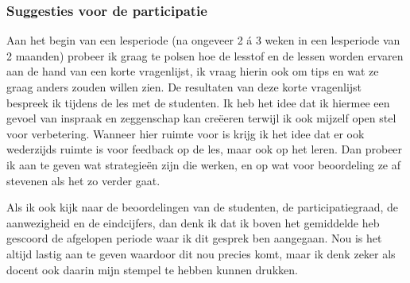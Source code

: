 \subsubsection{Suggesties voor de participatie }
Aan het begin van een lesperiode (na ongeveer 2 á 3 weken in een lesperiode van 2 maanden) probeer ik graag te polsen hoe de lesstof en de lessen worden ervaren aan de hand van een korte vragenlijst, ik vraag hierin ook om tips en wat ze graag anders zouden willen zien. De resultaten van deze korte vragenlijst bespreek ik tijdens de les met de studenten. Ik heb het idee dat ik hiermee een gevoel van inspraak en zeggenschap kan creëeren terwijl ik ook mijzelf open stel voor verbetering. Wanneer hier ruimte voor is krijg ik het idee dat er ook wederzijds ruimte is voor feedback op de les, maar ook op het leren. Dan probeer ik aan te geven wat strategieën zijn die werken, en op wat voor beoordeling ze af stevenen als het zo verder gaat.

Als ik ook kijk naar de beoordelingen van de studenten, de participatiegraad, de aanwezigheid en de eindcijfers, dan denk ik dat ik boven het gemiddelde heb gescoord de afgelopen periode waar ik dit gesprek ben aangegaan. Nou is het altijd lastig aan te geven waardoor dit nou precies komt, maar ik denk zeker als docent ook daarin mijn stempel te hebben kunnen drukken. 